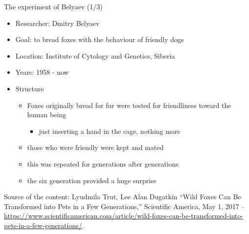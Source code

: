 \documentclass{beamer}
\begin{document}
\begin{frame}
{\centerline{The experiment of Belyaev (1/3)}}


\begin{itemize}
\item Researcher: Dmitry Belyaev
\item Goal: to bread foxes with the behaviour of friendly dogs
\item Location: Institute of Cytology and Genetics, Siberia
\item Years: 1958 - now
\item Structure
\begin{itemize}
\item Foxes originally bread for fur were tested for friendliness toward the human being
\begin{itemize}
\item just inserting a hand in the cage, nothing more
\end{itemize} 
\item those who were friendly were kept and mated
\item this was repeated for generations after generations
\item the six generation provided a huge surprise
\end{itemize} 

\end{itemize} 

\begin{center}
\tiny
Source of the content: Lyudmila Trut, Lee Alan Dugatkin ``Wild Foxes Can Be Transformed into Pets in a Few Generations,'' Scientific America, May 1, 2017 -- \url{https://www.scientificamerican.com/article/wild-foxes-can-be-transformed-into-pets-in-a-few-generations/}.
\end{center}

\end{frame}
\end{document}
